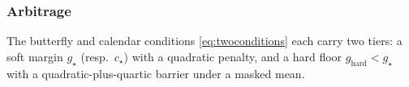 
%
%

\vspace{-0.4cm}


\subsubsection*{Arbitrage}

\vspace{-0.4cm}


The butterfly and calendar conditions \eqref{eq:twoconditions} each carry two tiers: a soft margin
$g_{\star}$ (resp.\ $c_{\star}$) with a quadratic penalty, and a hard floor
$g_{\mathrm{hard}}<g_{\star}$ with a quadratic-plus-quartic barrier under a masked mean. 

